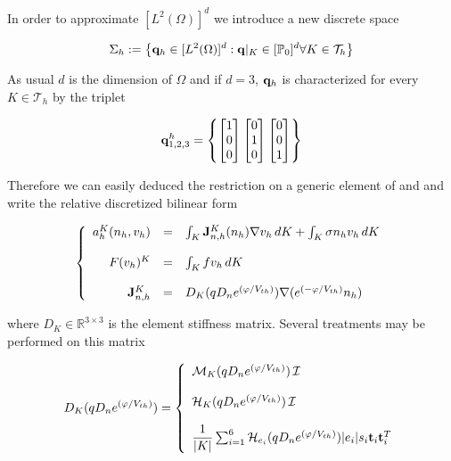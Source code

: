 In order to approximate $[L^2(\Omega)]^d$ we introduce a new discrete space

\begin{equation}
\Sigma_h := \left\{   \mathbf{q}_h \in  [L^2(\Omega)]^d : \mathbf{q}|_{K} \in [\mathbb{P}_0]^d \forall K \in \mathcal{T}_h\right\}
\end{equation} 

As usual $d$ is the dimension of $\Omega$ and if $d=3$, $\mathbf{q}_h$ is characterized for every $K \in \mathcal{T}_h$ by the triplet

\begin{equation}
\label{eq: form of qh}
\mathbf{q}^h_{1,2,3} = \left\{ \begin{bmatrix} 1 \\ 0 \\ 0 \end{bmatrix}  \begin{bmatrix} 0 \\ 1 \\ 0 \end{bmatrix}  \begin{bmatrix} 0 \\ 0 \\ 1 \end{bmatrix}  \right\}
\end{equation}

Therefore we can easily deduced the restriction on a generic element of  and  and write the relative discretized bilinear form

\begin{equation}
\label{eq: LEC discretized general}
\left\{
\begin{array}{rcl}
a_h^K(n_h,v_h) & = & \int_{K}\mathbf{ J}_{n,h}^K(n_h) \nabla v_h \, dK + \int_{K} \sigma n_h v_h \, dK 
\\
\\
F(v_h)^K & = & \int_K f v_h \, dK
\\
\\
\mathbf{J}_{n,h}^K & = & D_K(qD_n e^{(\varphi/V_{th})}) \nabla  (e^{(-\varphi / V_{th})}n_h)
\end{array}
\right.
\end{equation}

where $D_K \in \mathbb{R}^{3\times 3}$ is the element stiffness matrix. Several treatments may be performed on this matrix

\begin{equation}
D_K(qD_n e^{(\varphi/V_{th})}) = \left\{ 
\begin{array}{l}
\mathcal{M}_K(qD_n e^{(\varphi/V_{th})}) \, \mathcal{I}
\\
\\
\mathcal{H}_K(qD_n e^{(\varphi/V_{th})}) \, \mathcal{I}
\\
\\
 \dfrac{1}{|K|}\sum_{i=1}^6 \mathcal{H}_{e_i}(qD_n e^{(\varphi/V_{th})}) |e_i| s_i \mathbf{t}_i \mathbf{t}_i^T
\end{array}
\right.
\end{equation} 

